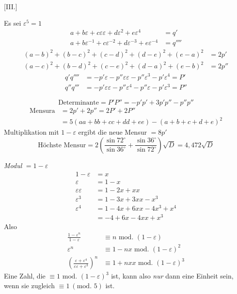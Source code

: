 %
\begin{center}[III.]\end{center}
Es sei $\varepsilon^5=1$
\[
\begin{aligned}
a+b\varepsilon+c\varepsilon\varepsilon+d\varepsilon^2+e\varepsilon^4&=q'\\
a+b\varepsilon^{-1}+c\varepsilon^{-2}+d\varepsilon^{-3}+e\varepsilon^{-4}&=q''''
\end{aligned}
\]
\[
\begin{aligned}
(a-b)^2+(b-c)^2+(c-d)^2+(d-e)^2+(e-a)^2&=2p'\\
(a-c)^2+(b-d)^2+(c-e)^2+(d-a)^2+(e-b)^2&=2p''
\end{aligned}
\]
\[
\begin{aligned}
q'q''''&=-p'\varepsilon-p''\varepsilon\varepsilon-p''\varepsilon^3-p'\varepsilon^4=P'\\
q''q'''&=-p'\varepsilon\varepsilon-p''\varepsilon^4-p''\varepsilon-p'\varepsilon^3=P''
\end{aligned}
\]

\[
\text{Determinante}=P'P''=-p'p'+3p'p''-p''p''
\]
\[
\begin{aligned}
\text{Mensura}&=2p'+2p''=2P'+2P''\\
&=5(aa+bb+cc+dd+ee)-(a+b+c+d+e)^2
\end{aligned}
\]
Multiplikation mit $1-\varepsilon$ ergibt die neue Mensur $=8p'$
\[
\text{Höchste Mensur}=2\left(\frac{\sin72^\circ}{\sin36^\circ}+\frac{\sin36^\circ}{\sin72^\circ}\right)\surd D=4{,}472\surd D
\]

\emph{Modul} $=1-\varepsilon$
\[
\begin{aligned}
1-\varepsilon&=x\\
\varepsilon&=1-x\\
\varepsilon\varepsilon&=1-2x+xx\\
\varepsilon^3&=1-3x+3xx-x^3\\
\varepsilon^4&=1-4x+6xx-4x^3+x^4\\
&=-4+6x-4xx+x^3
\end{aligned}
\]
Also
\[
\begin{aligned}
\frac{1-\varepsilon^n}{1-\varepsilon}&\equiv n\text{ mod. }(1-\varepsilon)\\
\varepsilon^n&\equiv1-nx\text{ mod. }(1-\varepsilon)^2\\
\left(\frac{\varepsilon+\varepsilon^4}{\varepsilon\varepsilon+\varepsilon^3}\right)^n&\equiv1+nxx\text{ mod. }(1-\varepsilon)^3
\end{aligned}
\]
Eine Zahl, die $\equiv1\text{ mod. }(1-\varepsilon)^3$ ist, kann also \emph{nur} dann eine Einheit sein, wenn sie zugleich $\equiv1\ (\text{mod. }5)$ ist.

